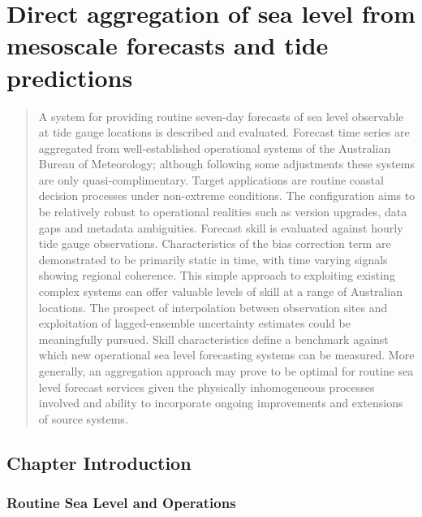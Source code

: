 \chapter{Direct aggregation of sea level from mesoscale forecasts and tide predictions} 
\label{chp:aggregate}
\begin{quote}
{\small
A system for providing routine seven-day forecasts of sea level observable at tide gauge locations is described and evaluated.
Forecast time series are aggregated from well-established operational systems of the Australian Bureau of Meteorology; although following some adjustments these systems are only quasi-complimentary.
Target applications are routine coastal decision processes under non-extreme conditions.
The configuration aims to be relatively robust to operational realities such as version upgrades, data gaps and metadata ambiguities.
Forecast skill is evaluated against hourly tide gauge observations.  
Characteristics of the bias correction term are demonstrated to be primarily static in time, with time varying signals showing regional coherence.
This simple approach to exploiting existing complex systems can offer valuable levels of skill at a range of Australian locations.
The prospect of interpolation between observation sites and exploitation of lagged-ensemble uncertainty estimates could be meaningfully pursued. 
Skill characteristics define a benchmark against which new operational sea level forecasting systems can be measured. 
More generally, an aggregation approach may prove to be optimal for routine sea level forecast services given the physically inhomogeneous processes involved and ability to incorporate ongoing improvements and extensions of source systems.
}
\end{quote}


\section{Chapter Introduction}
\subsection{Routine Sea Level and Operations}

